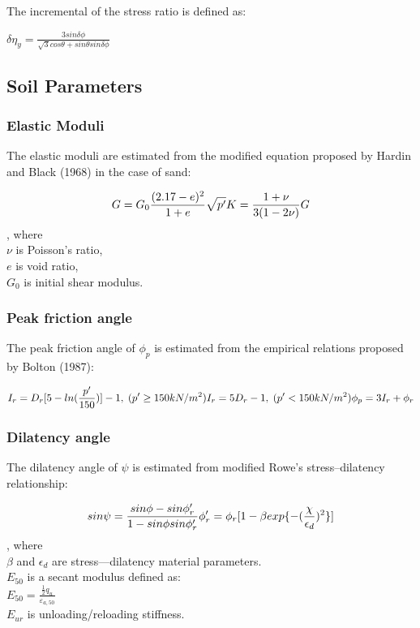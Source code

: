 \documentclass[a4paper, nobind]{templates/ociamthesis}
\begin{document}
The incremental of the stress ratio is defined as:

\(\delta \eta_y = \frac{3 sin \delta \phi}{\sqrt{3}cos\theta+sin\theta sin\delta\phi}\)

\hypertarget{soil-parameters}{%
\subsection{Soil Parameters}\label{soil-parameters}}

\hypertarget{elastic-moduli}{%
\subsubsection{Elastic Moduli}\label{elastic-moduli}}

The elastic moduli are estimated from the modified equation proposed by Hardin and Black (1968) in the case of sand:

\[
G = G_0 \frac{(2.17-e)^2}{1+e}\sqrt{p'} \\
K = \frac{1+\nu}{3(1-2 \nu)}G
\]
, where\\
\(\nu\) is Poisson's ratio,\\
\(e\) is void ratio,\\
\(G_0\) is initial shear modulus.

\hypertarget{peak-friction-angle}{%
\subsubsection{Peak friction angle}\label{peak-friction-angle}}

The peak friction angle of \(\phi_p\) is estimated from the empirical relations proposed by Bolton (1987):

\[
I_r = D_r[5-ln(\frac{p'}{150})]-1, \; (p' \geq 150 kN/m^2) \\
I_r = 5D_r -1 , \; (p' < 150 kN/m^2) \\ 
\phi_p = 3I_r + \phi_r
\]

\hypertarget{dilatency-angle}{%
\subsubsection{Dilatency angle}\label{dilatency-angle}}

The dilatency angle of \(\psi\) is estimated from modified Rowe's stress--dilatency relationship:

\[
sin\psi = \frac{sin\phi-sin\phi_r'}{1-sin\phi sin\phi_r'} \\
\phi_r' = \phi_r[1-\beta exp\{-(\frac{\chi}{\epsilon_d})^2\}]
\]
, where\\
\(\beta\) and \(\epsilon_d\) are stress---dilatency material parameters.\\
\(E_{50}\) is a secant modulus defined as:\\
\(E_{50} = \frac{\frac{1}{2}q_{u}}{\varepsilon_{a,50}}\)\\
\(E_{ur}\) is unloading/reloading stiffness.
\end{document}
